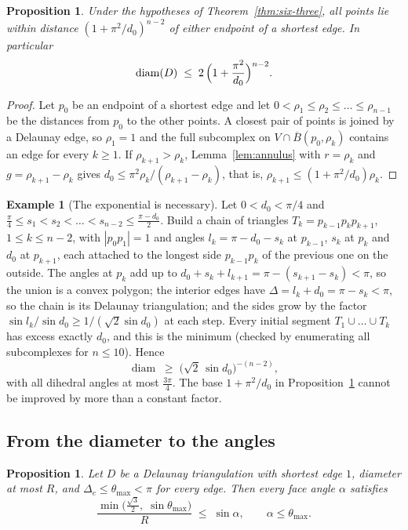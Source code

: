 \documentclass[11pt]{amsart}
\newtheorem{proposition}[theorem]{Proposition}
\theoremstyle{definition}
\newtheorem{example}[theorem]{Example}
\theoremstyle{remark}
\DeclareMathOperator{\diam}{diam}
\begin{document}
\begin{proposition}\label{prop:diam}
Under the hypotheses of Theorem~\ref{thm:six-three}, all points lie within distance $(1+\pi^2/d_0)^{n-2}$ of either endpoint of a shortest edge. In particular
\[
\diam(D)\;\le\;2\,\Bigl(1+\frac{\pi^2}{d_0}\Bigr)^{n-2}.
\]
\end{proposition}

\begin{proof}
Let $p_0$ be an endpoint of a shortest edge and let $0<\rho_1\le\rho_2\le\dots\le\rho_{n-1}$ be the distances from $p_0$ to the other points. A closest pair of points is joined by a Delaunay edge, so $\rho_1=1$ and the full subcomplex on $V\cap\overline B(p_0,\rho_k)$ contains an edge for every $k\geq1$.
If $\rho_{k+1}>\rho_k$, Lemma~\ref{lem:annulus} with $r=\rho_k$ and $g=\rho_{k+1}-\rho_k$ gives $d_0\le\pi^2\rho_k/(\rho_{k+1}-\rho_k)$, that is, $\rho_{k+1}\le(1+\pi^2/d_0)\rho_k$.
\end{proof}

\begin{example}[The exponential is necessary]\label{ex:needles}
Let $0<d_0<\pi/4$ and $\frac\pi4\le s_1<s_2<\dots<s_{n-2}\le\frac{\pi-d_0}2$. Build a chain of triangles $T_k=p_{k-1}p_kp_{k+1}$, $1\le k\le n-2$, with $|p_0p_1|=1$ and angles $l_k=\pi-d_0-s_k$ at $p_{k-1}$, $s_k$ at $p_k$ and $d_0$ at $p_{k+1}$, each attached to the longest side $p_{k-1}p_k$ of the previous one on the outside.
The angles at $p_k$ add up to $d_0+s_k+l_{k+1}=\pi-(s_{k+1}-s_k)<\pi$, so the union is a convex polygon; the interior edges have $\Delta=l_k+d_0=\pi-s_k<\pi$, so the chain is its Delaunay triangulation; and the sides grow by the factor $\sin l_k/\sin d_0\ge1/(\sqrt2\sin d_0)$ at each step.
Every initial segment $T_1\cup\dots\cup T_k$ has excess exactly $d_0$, and this is the minimum (checked by enumerating all subcomplexes for $n\le10$). Hence
\[
\diam\;\ge\;\bigl(\sqrt2\,\sin d_0\bigr)^{-(n-2)},
\]
with all dihedral angles at most $\frac{3\pi}4$. The base $1+\pi^2/d_0$ in Proposition~\ref{prop:diam} cannot be improved by more than a constant factor.
\end{example}

\subsection{From the diameter to the angles}

\begin{proposition}\label{prop:angles}
Let $D$ be a Delaunay triangulation with shortest edge $1$, diameter at most $R$, and $\Delta_e\le\theta_{\max}<\pi$ for every edge. Then every face angle $\alpha$ satisfies
\[
\frac{\min\bigl(\tfrac{\sqrt3}2,\;\sin\theta_{\max}\bigr)}{R}\;\le\;\sin\alpha,\qquad \alpha\le\theta_{\max}.
\]
\end{proposition}
\end{document}
